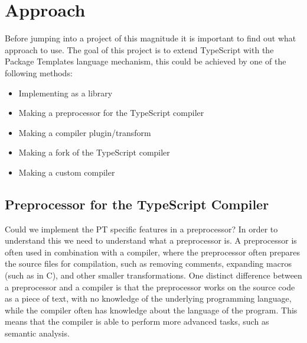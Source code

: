 \section{Approach}\label{sec:choosing-the-right-approach}

Before jumping into a project of this magnitude it is important to find out what approach to use. 
The goal of this project is to extend TypeScript with the Package Templates language mechanism, this could be achieved by one of the following methods:

\begin{itemize}
    \item Implementing as a library
    \item Making a preprocessor for the TypeScript compiler
    \item Making a compiler plugin/transform
    \item Making a fork of the TypeScript compiler
    \item Making a custom compiler
\end{itemize}



\subsection{Preprocessor for the TypeScript Compiler}\label{subsec:preprocessor-for-the-typescript-compiler}

Could we implement the PT specific features in a preprocessor?
In order to understand this we need to understand what a preprocessor is.
A preprocessor is often used in combination with a compiler, where the preprocessor often prepares the source files for compilation, such as removing comments, expanding macros (such as  in C), and other smaller transformations.
One distinct difference between a preprocessor and a compiler is that the preprocessor works on the source code as a piece of text, with no knowledge of the underlying programming language, while the compiler often has knowledge about the language of the program.
This means that the compiler is able to perform more advanced tasks, such as semantic analysis.

